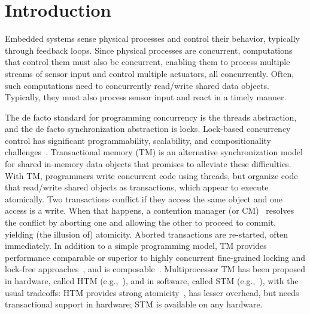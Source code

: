 \documentclass[12pt,english]{report}
\begin{document}
\thispagestyle{empty}



\pagestyle{myheadings}

\chapter{Introduction}

Embedded systems sense physical processes and control their behavior, typically through feedback loops. Since physical processes are concurrent, computations that control them must also be concurrent, enabling them to process multiple streams of sensor input and control multiple actuators, all concurrently. Often, such computations need to concurrently read/write shared data objects. Typically, they must also process sensor input and react in a timely manner. 

The de facto standard for programming concurrency is the threads abstraction, and the de facto synchronization abstraction is locks. 
Lock-based concurrency control has significant programmability, scalability, and compositionality challenges~\cite{Herlihy:2006:AMP:1146381.1146382}. Transactional memory (TM) is an alternative synchronization model for shared in-memory data objects that promises to alleviate these difficulties.  With TM, programmers write concurrent code using threads, but organize code that read/write shared objects as transactions, which appear to execute atomically. Two transactions conflict if they access the same object and one access is a write. When that happens, a contention manager (or CM)~\cite{Guerraoui:2005:TTT:1073814.1073863} resolves the conflict by aborting one and allowing the other to proceed to commit, yielding (the illusion of) atomicity. Aborted transactions are re-started, often immediately.  In addition to a simple programming model, TM provides performance comparable or superior to highly concurrent fine-grained locking and lock-free approaches~\cite{Saha:2006:MHP:1122971.1123001}, and is composable~\cite{Harris:2005:CMT:1065944.1065952}. Multiprocessor TM has been proposed in hardware, called HTM (e.g.,~\cite{austenmc:tcc:dissertation:2009}), and in software, called STM (e.g.,~\cite{sha95}), with the usual tradeoffs: HTM provides strong atomicity~\cite{austenmc:tcc:dissertation:2009}, has lesser overhead, but needs transactional support in hardware; STM is available on any hardware.
\end{document}
